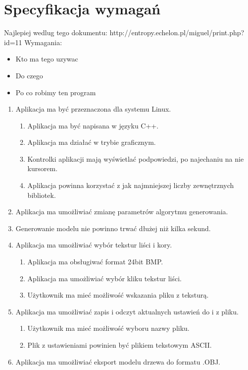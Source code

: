 \chapter{Specyfikacja wymagań}
Najlepiej wedlug tego dokumentu:
http://entropy.echelon.pl/miguel/print.php?id=11
Wymagania:\\
\begin{itemize}
\item Kto ma tego uzywac
\item Do czego
\item Po co robimy ten program
\end{itemize}
\begin{enumerate}

\item Aplikacja ma być przeznaczona dla systemu Linux. 
\begin{enumerate}
\item Aplikacja ma być napisana w języku C++.
\item Aplikacja ma działać w trybie graficznym.
\item Kontrolki aplikacji mają wyświetlać podpowiedzi, po najechaniu na nie kursorem.
\item Aplikacja powinna korzystać z jak najmniejszej liczby zewnętrznych bibliotek.
\end{enumerate}
\item Aplikacja ma umożliwiać zmianę parametrów algorytmu generowania.
\item Generowanie modelu nie powinno trwać dłużej niż kilka sekund.
\item Aplikacja ma umożliwiać wybór tekstur liści i kory.
\begin{enumerate}
\item Aplikacja ma obsługiwać format 24bit BMP. 
\item Aplikacja ma umożliwiać wybór kliku tekstur liści.
\item Użytkownik ma mieć możliwość wskazania pliku z teksturą.
\end{enumerate}
\item  Aplikacja ma umożliwiać zapis i odczyt aktualnych ustawień do i z pliku.
\begin{enumerate}
\item Użytkownik ma mieć możliwość wyboru nazwy pliku.
\item Plik z ustawieniami powinien być plikiem tekstowym ASCII.
\end{enumerate}
\item Aplikacja ma umożliwiać eksport modelu drzewa do formatu .OBJ.

\end{enumerate}
